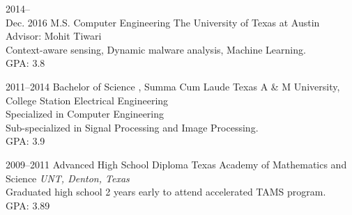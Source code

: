\documentclass[]{friggeri-cv} %
\begin{document}
\begin{entrylist}


\entry
{2014-- \\ Dec. 2016}
{M.S. {\normalfont Computer Engineering}}
{The University of Texas at Austin}
{Advisor: Mohit Tiwari \\ Context-aware sensing, Dynamic malware analysis, Machine Learning. \\ GPA: 3.8}


\entry
{2011--2014}
{Bachelor of Science {\normalfont, Summa Cum Laude}}
{Texas A \& M University, College Station}
{Electrical Engineering \\ Specialized in Computer Engineering \\ Sub-specialized in Signal Processing and Image Processing. \\ GPA: 3.9}


\entry
{2009--2011}
{Advanced High School Diploma}
{Texas Academy of Mathematics and Science}
{\emph{UNT, Denton, Texas}
 \\ Graduated high school 2 years early to attend accelerated TAMS program. \\ GPA: 3.89}

\end{entrylist}


%
%
%
%
%
%
%
\end{document}
